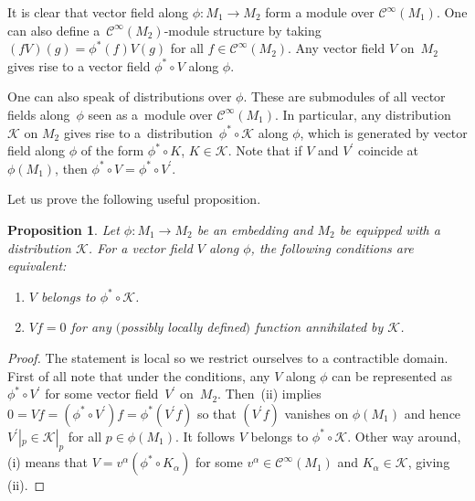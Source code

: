 \documentclass[pdftex]{sigma}
\numberwithin{equation}{section}
\newtheorem{Proposition}[Theorem]{Proposition}
\theoremstyle{definition}
\newcommand{\cC}{\mathcal{C}}
\def\cK{\mathcal{K}}
\begin{document}
It is clear that vector field along $\phi\colon M_1\rightarrow M_2$ form a module over $\cC^{\infty}(M_1)$. One can also define a~$\cC^{\infty}(M_2)$-module structure by taking $(fV)(g)=\phi^*(f)V(g)$ for all $f\in \cC^{\infty}(M_2)$. Any vector field $V$ on~$M_2$ gives rise to a vector field $\phi^*\circ V$ along $\phi$.

One can also speak of distributions over $\phi$. These are submodules of all vector fields along~$\phi$ seen as a~module over $\cC^\infty(M_1)$. In particular, any distribution $\cK$ on $M_2$ gives rise to a~distribution~${\phi^*\circ \cK}$ along $\phi$, which is generated by vector field along $\phi$ of the form $\phi^*\circ K$, $K\in \cK$. Note that if $V$ and $V^\prime$ coincide at $\phi(M_1)$, then $\phi^*\circ V=\phi^*\circ V^\prime$.

Let us prove the following useful proposition.

\begin{Proposition}\label{prop2}
 Let $\phi\colon M_1\rightarrow M_2$ be an embedding
 and $M_2$ be equipped with a distribution $\mathcal{K}$. For a vector field $V$ along $\phi$, the following conditions are equivalent:
 \begin{enumerate}\itemsep=0pt
 \item[$(i)$] $V$ belongs to $\phi^*\circ \cK$.
 \item[$(ii)$] $Vf=0$ for any $($possibly locally defined$)$ function annihilated by $\cK$.
 \end{enumerate}
\end{Proposition}
\begin{proof}
The statement is local so we restrict ourselves to a contractible domain. First of all note that under the conditions, any $V$ along $\phi$ can be represented as $\phi^*\circ V^\prime$ for some vector field~$V^\prime$ on~$M_2$. Then~(ii) implies $0=Vf=(\phi^*\circ V^\prime) f=\phi^*(V^\prime f)$ so that $(V^\prime f)$ vanishes on $\phi(M_1)$ and hence $V^\prime|_p\in \cK|_p$ for all $p \in \phi(M_1)$. It follows $V$ belongs to $\phi^*\circ \cK$.
Other way around, (i) means that $V=v^\alpha (\phi^*\circ K_\alpha)$ for some $v^\alpha \in\cC^{\infty}(M_1)$ and $K_\alpha \in \cK$, giving (ii).
\end{proof}
\end{document}
